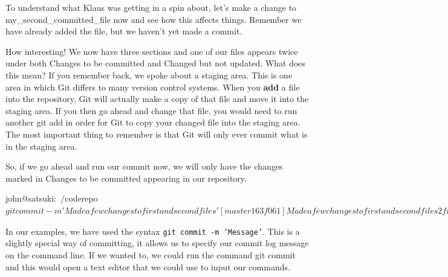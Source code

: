 To understand what Klaus was getting in a spin about, let's make a change to my\_second\_committed\_file now and see how this affects things.
Remember we have already added the file, but we haven't yet made a commit.


How interesting! We now have three sections and one of our files appears twice under both Changes to be committed and Changed but not updated.
What does this mean? If you remember back, we spoke about a staging area.
This is one area in which Git differs to many version control systems.
When you \textbf{add} a file into the repository, Git will actually make a copy of that file and move it into the staging area.
If you then go ahead and change that file, you would need to run another git add in order for Git to copy your changed file into the staging area.
The most important thing to remember is that Git will only ever commit what is in the staging area.

So, if we go ahead and run our commit now, we will only have the changes marked in Changes to be committed appearing in our repository.

\begin{code}
john@satsuki:~/coderepo$ git commit -m 'Made a few changes to first and second files'
[master 163f061] Made a few changes to first and second files
 2 files changed, 2 insertions(+), 0 deletions(-)
 create mode 100644 my_second_committed_file
john@satsuki:~/coderepo$
\end{code}

In our examples, we have used the syntax \texttt{git commit -m 'Message'}.
This is a slightly special way of committing, it allows us to specify our commit log message on the command line.
If we wanted to, we could run the command git commit and this would open a text editor that we could use to input our commands.

